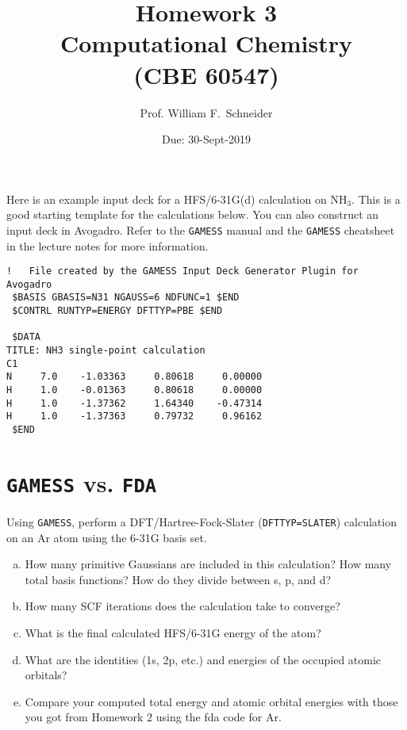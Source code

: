 \documentclass[11pt]{article}
\date{Due: 30-Sept-2019}
\title{}
\begin{document}
\title{Homework 3\\Computational Chemistry\\(CBE 60547)}
\author{Prof. William F.\ Schneider}
\maketitle

Here is an example input deck for a HFS/6-31G(d) calculation on NH\(_{\text{3}}\). This is a good starting template for the calculations below. You can also construct an input deck in Avogadro. Refer to the \texttt{GAMESS} manual and the \texttt{GAMESS} cheatsheet in the lecture notes for more information.

\begin{verbatim}
!   File created by the GAMESS Input Deck Generator Plugin for Avogadro
 $BASIS GBASIS=N31 NGAUSS=6 NDFUNC=1 $END
 $CONTRL RUNTYP=ENERGY DFTTYP=PBE $END

 $DATA 
TITLE: NH3 single-point calculation
C1
N     7.0    -1.03363     0.80618     0.00000
H     1.0    -0.01363     0.80618     0.00000
H     1.0    -1.37362     1.64340    -0.47314
H     1.0    -1.37363     0.79732     0.96162
 $END
\end{verbatim}


\section{\texttt{GAMESS} vs. \texttt{FDA}}
\label{sec:orgc85955c}
Using \texttt{GAMESS}, perform a DFT/Hartree-Fock-Slater (\texttt{DFTTYP=SLATER}) calculation on an Ar atom using the 6-31G basis set.

\begin{enumerate}[(a)]
\item How many primitive Gaussians are included in this calculation? How many total basis functions? How do they divide between s, p, and d?

\item How many SCF iterations does the calculation take to converge?

\item What is the final calculated HFS/6-31G energy of the atom?

\item What are the identities (1s, 2p, etc.) and energies of the occupied atomic orbitals?

\item Compare your computed total energy and atomic orbital energies with those you got from Homework 2 using the fda code for Ar.
\end{enumerate}
\end{document}
